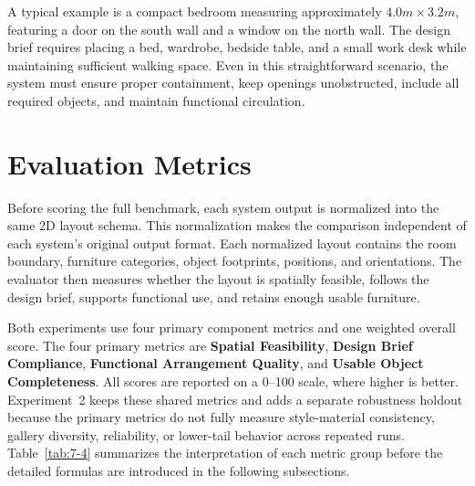 A typical example is a compact bedroom measuring approximately \(4.0m \times 3.2m\), featuring a door on the south wall and a window on the north wall. The design brief requires placing a bed, wardrobe, bedside table, and a small work desk while maintaining sufficient walking space. Even in this straightforward scenario, the system must ensure proper containment, keep openings unobstructed, include all required objects, and maintain functional circulation.

\section{Evaluation Metrics}\label{subsec:eval-layout-metrics}

Before scoring the full benchmark, each system output is normalized into the same 2D layout schema. This normalization makes the comparison independent of each system's original output format. Each normalized layout contains the room boundary, furniture categories, object footprints, positions, and orientations. The evaluator then measures whether the layout is spatially feasible, follows the design brief, supports functional use, and retains enough usable furniture.

Both experiments use four primary component metrics and one weighted overall score. The four primary metrics are \textbf{Spatial Feasibility}, \textbf{Design Brief Compliance}, \textbf{Functional Arrangement Quality}, and \textbf{Usable Object Completeness}. All scores are reported on a 0--100 scale, where higher is better. Experiment~2 keeps these shared metrics and adds a separate robustness holdout because the primary metrics do not fully measure style-material consistency, gallery diversity, reliability, or lower-tail behavior across repeated runs. Table~\ref{tab:7-4} summarizes the interpretation of each metric group before the detailed formulas are introduced in the following subsections.

